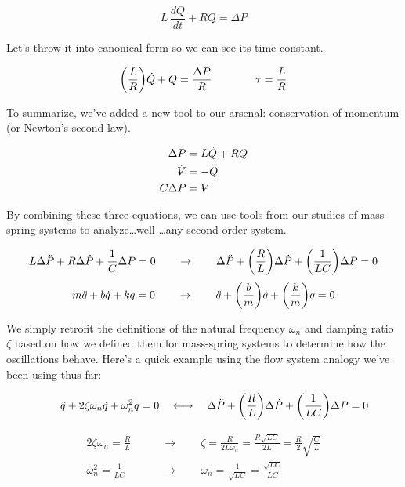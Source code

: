 \documentclass{report}
\newcommand{\Volume}{{\ooalign{\hfil$V$\hfil\cr\kern0.08em--\hfil\cr}}}
\begin{document}
\begin{onehalfspacing}
\begin{flushleft}
\vspace{-0.1in}
\[L \, \frac{dQ}{dt} + RQ = \Delta P\]

Let's throw it into canonical form so we can see its time constant.

\vspace{-0.1in}
\[\qty(\frac{L}{R}) \dot{Q} + Q = \frac{\Delta P}{R} \qquad \qquad \tau = \frac{L}{R}\]

To summarize, we've added a new tool to our arsenal: conservation of momentum (or Newton's second law). 

\vspace{-0.25in}
\begin{align*}
    \Delta P &= L \dot{Q} + RQ \\
    \dot{\Volume} &= -Q\\
    C \Delta P &= \Volume
\end{align*}
\vspace{-0.25in}

By combining these three equations, we can use tools from our studies of mass-spring systems to analyze\dots well \dots any second order system.

\vspace{-0.1in}
\[L \Delta \ddot{P} + R \Delta \dot{P} + \frac{1}{C} \Delta P = 0 \qquad \to \qquad \Delta \ddot{P} + \qty(\frac{R}{L}) \Delta \dot{P} + \qty(\frac{1}{LC}) \Delta P = 0\]
\[m \ddot{q} + b \dot{q} + k q = 0 \qquad \to \qquad \ddot{q} + \qty(\frac{b}{m}) \dot{q} + \qty(\frac{k}{m}) q = 0\]

We simply retrofit the definitions of the natural frequency \(\omega_n\) and damping ratio \(\zeta\) based on how we defined them for mass-spring systems to determine how the oscillations behave. Here's a quick example using the flow system analogy we've been using thus far:

\vspace{-0.1in}
\[\qquad \ddot{q} + 2\zeta\omega_n \dot{q} + \omega_n^2 q = 0 \quad \longleftrightarrow \quad  \Delta \ddot{P} + \qty(\frac{R}{L}) \Delta \dot{P} + \qty(\frac{1}{LC}) \Delta P = 0\]

\vspace{-0.25in}
\begin{align*}
    2 \zeta \omega_n = \frac{R}{L} \qquad &\longrightarrow \qquad \zeta = \frac{R}{2L \omega_n} = \frac{R\sqrt{LC}}{2L} = \frac{R}{2} \sqrt{\frac{C}{L}}\\
    \omega_n^2 = \frac{1}{LC} \qquad &\longrightarrow \qquad \omega_n = \frac{1}{\sqrt{LC}} = \frac{\sqrt{LC}}{LC}
\end{align*}


\end{flushleft}
\end{onehalfspacing}
\end{document}
